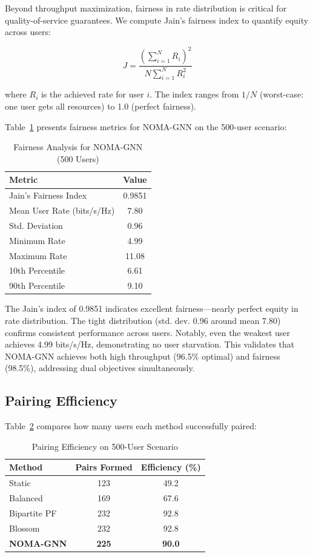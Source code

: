 Beyond throughput maximization, fairness in rate distribution is critical for quality-of-service guarantees. We compute Jain's fairness index to quantify equity across users:

\begin{equation}
J = \frac{\left(\sum_{i=1}^{N} R_i\right)^2}{N \sum_{i=1}^{N} R_i^2}
\end{equation}

where $R_i$ is the achieved rate for user $i$. The index ranges from $1/N$ (worst-case: one user gets all resources) to 1.0 (perfect fairness).

Table~\ref{tab:fairness} presents fairness metrics for NOMA-GNN on the 500-user scenario:

\begin{table}[h]
\centering
\caption{Fairness Analysis for NOMA-GNN (500 Users)}
\label{tab:fairness}
\begin{tabular}{lc}
\toprule
\textbf{Metric} & \textbf{Value} \\
\midrule
Jain's Fairness Index & 0.9851 \\
Mean User Rate (bits/s/Hz) & 7.80 \\
Std. Deviation & 0.96 \\
Minimum Rate & 4.99 \\
Maximum Rate & 11.08 \\
10th Percentile & 6.61 \\
90th Percentile & 9.10 \\
\bottomrule
\end{tabular}
\end{table}

The Jain's index of 0.9851 indicates excellent fairness—nearly perfect equity in rate distribution. The tight distribution (std. dev. 0.96 around mean 7.80) confirms consistent performance across users. Notably, even the weakest user achieves 4.99 bits/s/Hz, demonstrating no user starvation. This validates that NOMA-GNN achieves both high throughput (96.5\% optimal) and fairness (98.5\%), addressing dual objectives simultaneously.

\subsection{Pairing Efficiency}

Table~\ref{tab:pairing_efficiency} compares how many users each method successfully paired:

\begin{table}[h]
\centering
\caption{Pairing Efficiency on 500-User Scenario}
\label{tab:pairing_efficiency}
\begin{tabular}{lcc}
\toprule
\textbf{Method} & \textbf{Pairs Formed} & \textbf{Efficiency (\%)} \\
\midrule
Static & 123 & 49.2 \\
Balanced & 169 & 67.6 \\
Bipartite PF & 232 & 92.8 \\
Blossom & 232 & 92.8 \\
\textbf{NOMA-GNN} & \textbf{225} & \textbf{90.0} \\
\bottomrule
\end{tabular}
\end{table}

